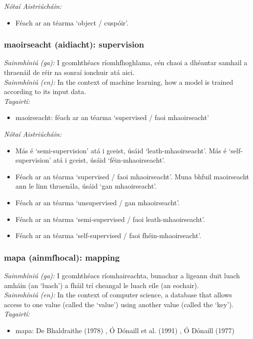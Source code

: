  \noindent \textit{Nótaí Aistriúcháin:}
\begin{itemize}
	\item Féach ar an téarma `object / cuspóir'.
\end{itemize}


\subsubsection*{maoirseacht (aidiacht): supervision}
 \noindent \textit{Sainmhíniú (ga):} I gcomhthéacs ríomhfhoghlama, cén chaoi a dhéantar samhail a thraenáil de réir na sonraí ionchuir atá aici.
\\
 \noindent \textit{Sainmhíniú (en):} In the context of machine learning, how a model is trained according to its input data.
\\
 \noindent \textit{Tagairtí:}
\begin{itemize}
	\item maoirseacht: féach ar an téarma `supervised / faoi mhaoirseacht'
\end{itemize}

 \noindent \textit{Nótaí Aistriúcháin:}
\begin{itemize}
	\item Más é `semi-supervision' atá i gceist, úsáid `leath-mhaoirseacht'. Más é `self-supervision' atá i gceist, úsáid `féin-mhaoirseacht'.
	\item Féach ar an téarma `supervised / faoi mhaoirseacht'. Muna bhfuil maoirseacht ann le linn thraenála, úsáid `gan mhaoirseacht'.
	\item Féach ar an téarma `unsupervised / gan mhaoirseacht'.
	\item Féach ar an téarma `semi-supervised / faoi leath-mhaoirseacht'.
	\item Féach ar an téarma `self-supervised / faoi fhéin-mhaoirseacht'.
\end{itemize}


\subsubsection*{mapa (ainmfhocal): mapping}
 \noindent \textit{Sainmhíniú (ga):} I gcomhthéacs ríomhaireachta, bunachar a ligeann duit luach amháin (an `luach') a fháil trí cheangal le luach eile (an eochair).
\\
 \noindent \textit{Sainmhíniú (en):} In the context of computer science, a database that allows access to one value (called the `value') using another value (called the `key').
\\
 \noindent \textit{Tagairtí:}
\begin{itemize}
	\item mapa: De Bhaldraithe (1978) \cite{de-bhaldraithe}, Ó Dónaill et al. (1991) \cite{focloir-beag}, Ó Dónaill (1977) \cite{odonaill}
\end{itemize}

